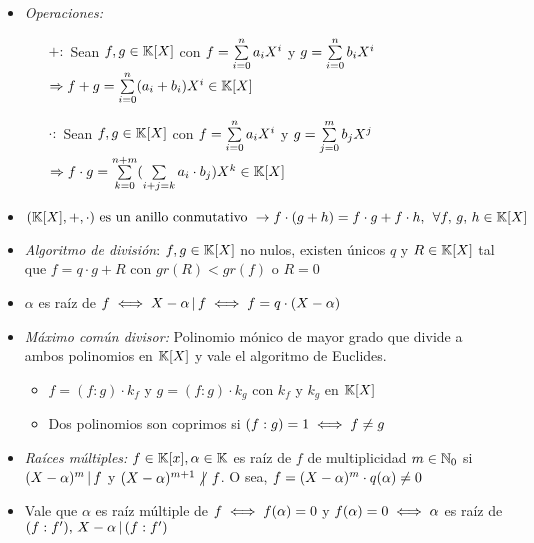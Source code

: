 \begin{itemize}
	\item \textit{Operaciones: }

	      \begin{itemize}
		      \item[$+:$] Sean $f,g \in \mathbb K[X]$ con $f = \sum\limits_{i=0}^{n} a_i X^i$ y $g = \sum\limits_{i=0}^{n} b_i X^i$\\
		            $\Rightarrow f + g = \sum\limits_{i=0}^{n} (a_i + b_i) X^i \in \mathbb K[X]$
		      \item[$\cdot:$] Sean $f,g \in \mathbb K[X]$ con $f = \sum\limits_{i=0}^{n} a_i X^i$ y $g = \sum\limits_{j=0}^{m} b_j X^j$\\
                $\Rightarrow f \cdot g = \sum\limits_{k=0}^{n+m} (\sum\limits_{i+j=k}^{} a_i \cdot b_j) X^k \in \mathbb K[X]$
	      \end{itemize}
        \item $(\mathbb K[X],+,\cdot) \text{ es un anillo conmutativo } \to f\cdot(g+h) = f\cdot g + f\cdot h,\, \;\forall f,\,g,\,h \in \mathbb K[X]$
	\item \textit{Algoritmo de división}: $f,g \in \mathbb K[X]$ no nulos, existen únicos $q$ y $R \in \mathbb K[X]$ tal que $f = q\cdot g + R$
	      con $gr(R) < gr(f)$ o $R = 0$

	\item $\alpha$ es raíz de $f \iff X - \alpha \, | \, f \iff f = q \cdot ( X - \alpha)$

	\item \textit{Máximo común divisor: } Polinomio mónico de mayor grado que divide a ambos polinomios en $\mathbb K[X]$
	      y vale el algoritmo de Euclides.
	      \begin{itemize}

		      \item $f = (f:g)\cdot k_f$ y $g = (f:g)\cdot k_g$ con $k_f$ y $k_g$ en $\mathbb K[X]$

		      \item Dos polinomios son coprimos si $(f:g) = 1 \iff f \neq g$
	      \end{itemize}

	\item \textit{Raíces múltiples: } $f \in \mathbb K[x], \alpha \in \mathbb K$ es raíz de $f$ de multiplicidad
	      $m \in \mathbb N_0$ si $(X - \alpha)^m \, | \, f$ y $(X - \alpha)^{m+1} \noDivide f$.
	      O sea, $f = (X - \alpha)^m \cdot q(\alpha) \neq 0$

	\item Vale que $\alpha$ es raíz múltiple de $f \iff f(\alpha) = 0$ y $f(\alpha) = 0 \iff \alpha$
      es raíz de $(f:f'),\, X - \alpha \, | \, (f:f')$

\end{itemize}

